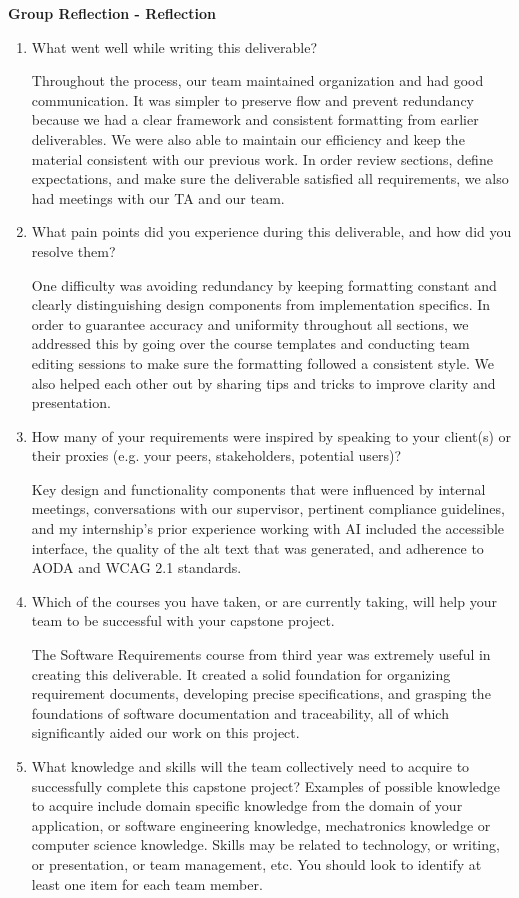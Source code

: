 \textbf{Group Reflection  - Reflection}
\begin{enumerate}
  \item What went well while writing this deliverable? 
  
  Throughout the process, our team maintained organization and had good communication.  It was simpler to preserve flow and prevent redundancy because we had a clear framework and consistent formatting from earlier deliverables.  We were also able to maintain our efficiency and keep the material consistent with our previous work.  In order review sections, define expectations, and make sure the deliverable satisfied all requirements, we also had meetings with our TA and our team.
  \item What pain points did you experience during this deliverable, and how did
  you resolve them?

  One difficulty was avoiding redundancy by keeping formatting constant and clearly distinguishing design components from implementation specifics. In order to guarantee accuracy and uniformity throughout all sections, we addressed this by going over the course templates and conducting team editing sessions to make sure the formatting followed a consistent style. We also helped each other out by sharing tips and tricks to improve clarity and presentation.

  \item How many of your requirements were inspired by speaking to your
  client(s) or their proxies (e.g. your peers, stakeholders, potential users)?
  
  Key design and functionality components that were influenced by internal meetings, conversations with our supervisor, pertinent compliance guidelines, and my internship's prior experience working with AI included the accessible interface, the quality of the alt text that was generated, and adherence to AODA and WCAG 2.1 standards.
  \item Which of the courses you have taken, or are currently taking, will help
  your team to be successful with your capstone project.

  The Software Requirements course from third year was extremely useful in creating this deliverable.  It created a solid foundation for organizing requirement documents, developing precise specifications, and grasping the foundations of software documentation and traceability, all of which significantly aided our work on this project.

  \item What knowledge and skills will the team collectively need to acquire to
  successfully complete this capstone project?  Examples of possible knowledge
  to acquire include domain specific knowledge from the domain of your
  application, or software engineering knowledge, mechatronics knowledge or
  computer science knowledge.  Skills may be related to technology, or writing,
  or presentation, or team management, etc.  You should look to identify at
  least one item for each team member. \newline
  

\end{enumerate}
